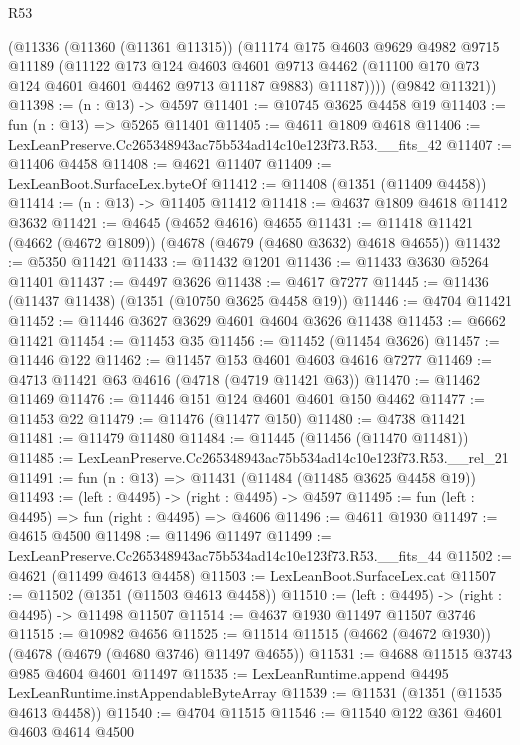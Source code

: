 \begin{lexlean}{R53}
\begin{coremodule}
        (@11336
          (@11360 (@11361 @11315))
          (@11174
            @175
            @4603
            @9629
            @4982
            @9715
            @11189
            (@11122
              @173
              @124
              @4603
              @4601
              @9713
              @4462
              (@11100 @170 @73 @124 @4601 @4601 @4462 @9713 @11187 @9883)
              @11187))))
      (@9842 @11321))
@11398 := (n : @13) -> @4597
@11401 := @10745 @3625 @4458 @19
@11403 := fun (n : @13) => @5265 @11401
@11405 := @4611 @1809 @4618
@11406 := LexLeanPreserve.Cc265348943ac75b534ad14c10e123f73.R53.__fits_42
@11407 := @11406 @4458
@11408 := @4621 @11407
@11409 := LexLeanBoot.SurfaceLex.byteOf
@11412 := @11408 (@1351 (@11409 @4458))
@11414 := (n : @13) -> @11405 @11412
@11418 := @4637 @1809 @4618 @11412 @3632
@11421 := @4645 (@4652 @4616) @4655
@11431 := @11418 @11421 (@4662 (@4672 @1809)) (@4678 (@4679 (@4680 @3632) @4618 @4655))
@11432 := @5350 @11421
@11433 := @11432 @1201
@11436 := @11433 @3630 @5264 @11401
@11437 := @4497 @3626
@11438 := @4617 @7277
@11445 := @11436 (@11437 @11438) (@1351 (@10750 @3625 @4458 @19))
@11446 := @4704 @11421
@11452 := @11446 @3627 @3629 @4601 @4604 @3626 @11438
@11453 := @6662 @11421
@11454 := @11453 @35
@11456 := @11452 (@11454 @3626)
@11457 := @11446 @122
@11462 := @11457 @153 @4601 @4603 @4616 @7277
@11469 := @4713 @11421 @63 @4616 (@4718 (@4719 @11421 @63))
@11470 := @11462 @11469
@11476 := @11446 @151 @124 @4601 @4601 @150 @4462
@11477 := @11453 @22
@11479 := @11476 (@11477 @150)
@11480 := @4738 @11421
@11481 := @11479 @11480
@11484 := @11445 (@11456 (@11470 @11481))
@11485 := LexLeanPreserve.Cc265348943ac75b534ad14c10e123f73.R53.__rel_21
@11491 := fun (n : @13) => @11431 (@11484 (@11485 @3625 @4458 @19))
@11493 := (left : @4495) -> (right : @4495) -> @4597
@11495 := fun (left : @4495) => fun (right : @4495) => @4606
@11496 := @4611 @1930
@11497 := @4615 @4500
@11498 := @11496 @11497
@11499 := LexLeanPreserve.Cc265348943ac75b534ad14c10e123f73.R53.__fits_44
@11502 := @4621 (@11499 @4613 @4458)
@11503 := LexLeanBoot.SurfaceLex.cat
@11507 := @11502 (@1351 (@11503 @4613 @4458))
@11510 := (left : @4495) -> (right : @4495) -> @11498 @11507
@11514 := @4637 @1930 @11497 @11507 @3746
@11515 := @10982 @4656
@11525 := @11514 @11515 (@4662 (@4672 @1930)) (@4678 (@4679 (@4680 @3746) @11497 @4655))
@11531 := @4688 @11515 @3743 @985 @4604 @4601 @11497
@11535 := LexLeanRuntime.append @4495 LexLeanRuntime.instAppendableByteArray
@11539 := @11531 (@1351 (@11535 @4613 @4458))
@11540 := @4704 @11515
@11546 := @11540 @122 @361 @4601 @4603 @4614 @4500

\end{coremodule}
\end{lexlean}
